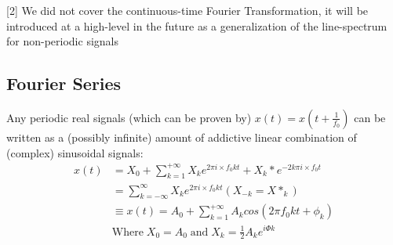 \documentclass{article}
\begin{document}
            [2] We did not cover the continuous-time Fourier Transformation, 
            it will be introduced at a high-level in the future as a generalization of the line-spectrum for non-periodic signals
    \subsection{Fourier Series}
        Any periodic real signals (which can be proven by) $x(t) = x(t + \frac{1}{f_0})$ 
        can be written as a (possibly infinite) amount of addictive linear combination of (complex) sinusoidal signals:
        \small{\begin{align}
            x(t)&= X_0 + \sum_{k = 1}^{+\infty}{X_k e^{2\pi i\times f_0 k t} + X_k* e^{-2k\pi i\times f_0 t}}\\
                &= \sum_{k = -\infty}^{\infty}{X_k e^{2\pi i\times f_0 k t}} (X_{-k} = X*_{k})\\
                &\equiv x(t) = A_0 + \sum_{k = 1}^{+\infty}{A_kcos(2\pi f_0kt + \phi_k)}\\
                &\text{Where}\; X_0 = A_0\;\text{and}\;X_k = \frac{1}{2} A_k e^{i\Phi k} \nonumber
        \end{align}}
\end{document}
